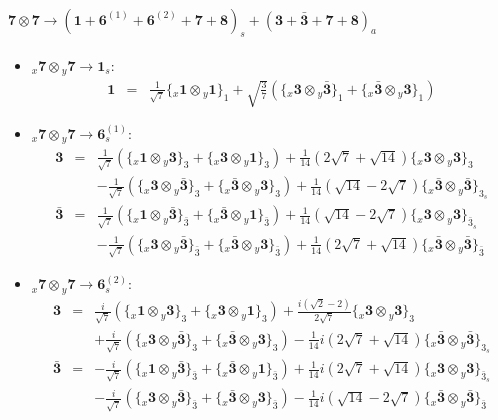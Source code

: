 \documentclass[english]{article}
\newcommand{\rep}[1]{\mathbf{#1}}
\newcommand{\repx}[2]{{}_{#2}\mathbf{#1}}
\newcommand{\subcg}[3]{\big\{ \repx{#1}{x}\otimes\repx{#2}{y}\big\}^{}_{#3}}
\begin{document}
\paragraph*{\Large $\rep{7}\otimes\rep{7}\to\left(\rep{1}+\rep{6}^{(1)}+\rep{6}^{(2)}+\rep{7}+\rep{8}\right)_s+\left(\rep{3}+\rep{\bar{3}}+\rep{7}+\rep{8}\right)_a$}
\begin{itemize}
\item $\repx{7}{x}\otimes\repx{7}{y}\to\rep{1}_{s}$:
\begin{eqnarray*}
\rep{1} &=& \frac{1}{\sqrt{7}}\subcg{1}{1}{1}+\sqrt{\frac{3}{7}}\left(\subcg{3}{\bar{3}}{1}+\subcg{\bar{3}}{3}{1}\right)
\end{eqnarray*}
\item $\repx{7}{x}\otimes\repx{7}{y}\to\rep{6}_{s}^{(1)}$:
\begin{eqnarray*}
\rep{3} &=& \frac{1}{\sqrt{7}}\left(\subcg{1}{3}{3}+\subcg{3}{1}{3}\right)+\frac{1}{14} \left(2 \sqrt{7}+\sqrt{14}\right)\subcg{3}{3}{3} \\ 
 & & -\frac{1}{\sqrt{7}}\left(\subcg{3}{\bar{3}}{3}+\subcg{\bar{3}}{3}{3}\right)+\frac{1}{14} \left(\sqrt{14}-2 \sqrt{7}\right)\subcg{\bar{3}}{\bar{3}}{3_{s}}
\\
\rep{\bar{3}} &=& \frac{1}{\sqrt{7}}\left(\subcg{1}{\bar{3}}{\bar{3}}+\subcg{\bar{3}}{1}{\bar{3}}\right)+\frac{1}{14} \left(\sqrt{14}-2 \sqrt{7}\right)\subcg{3}{3}{\bar{3}_{s}} \\ 
 & & -\frac{1}{\sqrt{7}}\left(\subcg{3}{\bar{3}}{\bar{3}}+\subcg{\bar{3}}{3}{\bar{3}}\right)+\frac{1}{14} \left(2 \sqrt{7}+\sqrt{14}\right)\subcg{\bar{3}}{\bar{3}}{\bar{3}}
\end{eqnarray*}
\item $\repx{7}{x}\otimes\repx{7}{y}\to\rep{6}_{s}^{(2)}$:
\begin{eqnarray*}
\rep{3} &=& \frac{i}{\sqrt{7}}\left(\subcg{1}{3}{3}+\subcg{3}{1}{3}\right)+\frac{i \left(\sqrt{2}-2\right)}{2 \sqrt{7}}\subcg{3}{3}{3} \\ 
 & & +\frac{i}{\sqrt{7}}\left(\subcg{3}{\bar{3}}{3}+\subcg{\bar{3}}{3}{3}\right)-\frac{1}{14} i \left(2 \sqrt{7}+\sqrt{14}\right)\subcg{\bar{3}}{\bar{3}}{3_{s}}
\\
\rep{\bar{3}} &=& -\frac{i}{\sqrt{7}}\left(\subcg{1}{\bar{3}}{\bar{3}}+\subcg{\bar{3}}{1}{\bar{3}}\right)+\frac{1}{14} i \left(2 \sqrt{7}+\sqrt{14}\right)\subcg{3}{3}{\bar{3}_{s}} \\ 
 & & -\frac{i}{\sqrt{7}}\left(\subcg{3}{\bar{3}}{\bar{3}}+\subcg{\bar{3}}{3}{\bar{3}}\right)-\frac{1}{14} i \left(\sqrt{14}-2 \sqrt{7}\right)\subcg{\bar{3}}{\bar{3}}{\bar{3}}

\end{eqnarray*}
\end{itemize}
\end{document}
